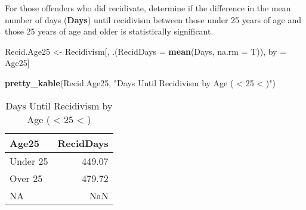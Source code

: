 \documentclass[
  12pt,
]{report}
\newenvironment{Shaded}{\begin{snugshade}}{\end{snugshade}}
\newcommand{\DataTypeTok}[1]{\textcolor[rgb]{0.13,0.29,0.53}{#1}}
\newcommand{\KeywordTok}[1]{\textcolor[rgb]{0.13,0.29,0.53}{\textbf{#1}}}
\newcommand{\NormalTok}[1]{#1}
\newcommand{\StringTok}[1]{\textcolor[rgb]{0.31,0.60,0.02}{#1}}
\begin{document}
For those offenders who did recidivate, determine if the difference in
the mean number of days (\textbf{Days}) until recidivism between those
under 25 years of age and those 25 years of age and older is
statistically significant.

\begin{Shaded}
\begin{Highlighting}[]
\NormalTok{Recid.Age25 <-}\StringTok{ }\NormalTok{Recidivism[, .(}\DataTypeTok{RecidDays =} \KeywordTok{mean}\NormalTok{(Days, }\DataTypeTok{na.rm =}\NormalTok{ T)), by =}\StringTok{ }\NormalTok{Age25]}

\KeywordTok{pretty_kable}\NormalTok{(Recid.Age25, }\StringTok{"Days Until Recidivism by Age ( < 25 < )"}\NormalTok{)}
\end{Highlighting}
\end{Shaded}

\begin{table}[!h]

\caption{\label{tab:unnamed-chunk-25}Days Until Recidivism by Age ( < 25 < )}
\centering
\begin{tabular}[t]{l|r}
\hline
Age25 & RecidDays\\
\hline
Under 25 & 449.07\\
\hline
Over 25 & 479.72\\
\hline
NA & NaN\\
\hline
\end{tabular}
\end{table}
\end{document}
